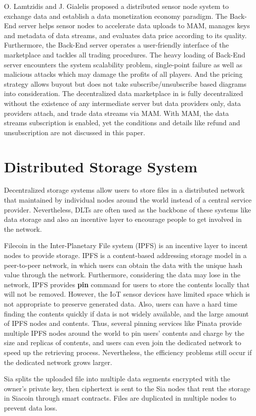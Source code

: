 \begin{spacing}{2.0}
O. Lamtzidis and J. Gialelis \cite{IOTASensorNode} proposed a distributed sensor node system to exchange data and establish a data monetization economy paradigm. The Back-End server helps sensor nodes to accelerate data uploads to MAM, manages keys and metadata of data streams, and evaluates data price according to its quality. Furthermore, the Back-End server operates a user-friendly interface of the marketplace and tackles all trading procedures. The heavy loading of Back-End server encounters the system scalability problem, single-point failure as well as malicious attacks which may damage the profits of all players. And the pricing strategy allows buyout but does not take subscribe/unsubscribe based diagrams into consideration. The decentralized data marketplace in \cite{DDMSmartCities} is fully decentralized without the existence of any intermediate server but data providers only, data providers attach, and trade data streams via MAM. With MAM, the data streams subscription is enabled, yet the conditions and details like refund and unsubscription are not discussed in this paper.
 
\section{Distributed Storage System}
\label{section:distributed_storage}
Decentralized storage systems allow users to store files in a distributed network that maintained by individual nodes around the world instead of a central service provider. Nevertheless, DLTs are often used as the backbone of these systems like data storage and also an incentive layer to encourage people to get involved in the network.

Filecoin \cite{FileCoin} in the Inter-Planetary File system (IPFS) is an incentive layer to incent nodes to provide storage. IPFS is a content-based addressing storage model in a peer-to-peer network, in which users can obtain the data with the unique hash value through the network. Furthermore, considering the data may lose in the network, IPFS provides \textbf{pin} command for users to store the contents locally that will not be removed. However, the IoT sensor devices have limited space which is not appropriate to preserve generated data. Also, users can have a hard time finding the contents quickly if data is not widely available, and the large amount of IPFS nodes and contents. Thus, several pinning services like Pinata provide multiple IPFS nodes around the world to pin users' contents and charge by the size and replicas of contents, and users can even join the dedicated network to speed up the retrieving process. Nevertheless, the efficiency problems still occur if the dedicated network grows larger.

Sia\cite{Sia} splits the uploaded file into multiple data segments encrypted with the owner's private key, then ciphertext is sent to the Sia nodes that rent the storage in Siacoin through smart contracts. Files are duplicated in multiple nodes to prevent data loss.

\end{spacing}

